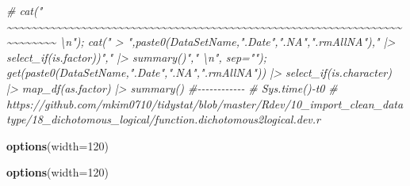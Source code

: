 \documentclass[
]{article}
\newenvironment{Shaded}{\begin{snugshade}}{\end{snugshade}}
\newcommand{\AttributeTok}[1]{\textcolor[rgb]{0.13,0.29,0.53}{#1}}
\newcommand{\CommentTok}[1]{\textcolor[rgb]{0.56,0.35,0.01}{\textit{#1}}}
\newcommand{\DecValTok}[1]{\textcolor[rgb]{0.00,0.00,0.81}{#1}}
\newcommand{\FunctionTok}[1]{\textcolor[rgb]{0.13,0.29,0.53}{\textbf{#1}}}
\newcommand{\NormalTok}[1]{#1}
\begin{document}
\begin{Shaded}
\begin{Highlighting}[]
\CommentTok{\# cat("    \textasciitilde{}\textasciitilde{}\textasciitilde{}\textasciitilde{}\textasciitilde{}\textasciitilde{}\textasciitilde{}\textasciitilde{}\textasciitilde{}\textasciitilde{}\textasciitilde{}\textasciitilde{}\textasciitilde{}\textasciitilde{}\textasciitilde{}\textasciitilde{}\textasciitilde{}\textasciitilde{}\textasciitilde{}\textasciitilde{}\textasciitilde{}\textasciitilde{}\textasciitilde{}\textasciitilde{}\textasciitilde{}\textasciitilde{}\textasciitilde{}\textasciitilde{}\textasciitilde{}\textasciitilde{}\textasciitilde{}\textasciitilde{}\textasciitilde{}\textasciitilde{}\textasciitilde{}\textasciitilde{}\textasciitilde{}\textasciitilde{}\textasciitilde{}\textasciitilde{}\textasciitilde{}\textasciitilde{}\textasciitilde{}\textasciitilde{}\textasciitilde{}\textasciitilde{}\textasciitilde{}\textasciitilde{}\textasciitilde{}\textasciitilde{}\textasciitilde{}\textasciitilde{}\textasciitilde{}\textasciitilde{}\textasciitilde{}\textasciitilde{}\textasciitilde{}\textasciitilde{}\textasciitilde{}\textasciitilde{}\textasciitilde{}\textasciitilde{}\textasciitilde{}\textasciitilde{}\textasciitilde{}\textasciitilde{}\textasciitilde{}\textasciitilde{}\textasciitilde{}\textasciitilde{}\textasciitilde{}\textasciitilde{}    \textbackslash{}n"); cat(" \textgreater{} ",paste0(DataSetName,".Date",".NA",".rmAllNA")," |\textgreater{} select\_if(is.factor))"," |\textgreater{} summary()","  \textbackslash{}n", sep=""); get(paste0(DataSetName,".Date",".NA",".rmAllNA")) |\textgreater{} select\_if(is.character) |\textgreater{} map\_df(as.factor) |\textgreater{} summary() \#{-}{-}{-}{-}{-}{-}{-}{-}{-}{-}{-}{-}  }
\CommentTok{\# Sys.time(){-}t0}
\CommentTok{\# https://github.com/mkim0710/tidystat/blob/master/Rdev/10\_import\_clean\_datatype/18\_dichotomous\_logical/function.dichotomous2logical.dev.r}
\end{Highlighting}
\end{Shaded}

\begin{Shaded}
\begin{Highlighting}[]
\FunctionTok{options}\NormalTok{(}\AttributeTok{width=}\DecValTok{120}\NormalTok{)}
\end{Highlighting}
\end{Shaded}

\begin{Shaded}
\begin{Highlighting}[]
\FunctionTok{options}\NormalTok{(}\AttributeTok{width=}\DecValTok{120}\NormalTok{)}
\end{Highlighting}
\end{Shaded}
\end{document}
